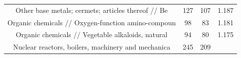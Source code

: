 \documentclass[10pt,]{article}
\begin{document}
\begin{longtable}[]{@{}cccc@{}}
\begin{minipage}[t]{0.38\columnwidth}
Other base metals; cermets; articles thereof // Be\strut
\end{minipage} & \begin{minipage}[t]{0.21\columnwidth}\centering\strut
127\strut
\end{minipage} & \begin{minipage}[t]{0.20\columnwidth}\centering\strut
107\strut
\end{minipage} & \begin{minipage}[t]{0.09\columnwidth}\centering\strut
1.187\strut
\end{minipage}\tabularnewline
\begin{minipage}[t]{0.38\columnwidth}\centering\strut
Organic chemicals // Oxygen-function amino-compoun\strut
\end{minipage} & \begin{minipage}[t]{0.21\columnwidth}\centering\strut
98\strut
\end{minipage} & \begin{minipage}[t]{0.20\columnwidth}\centering\strut
83\strut
\end{minipage} & \begin{minipage}[t]{0.09\columnwidth}\centering\strut
1.181\strut
\end{minipage}\tabularnewline
\begin{minipage}[t]{0.38\columnwidth}\centering\strut
Organic chemicals // Vegetable alkaloids, natural\strut
\end{minipage} & \begin{minipage}[t]{0.21\columnwidth}\centering\strut
94\strut
\end{minipage} & \begin{minipage}[t]{0.20\columnwidth}\centering\strut
80\strut
\end{minipage} & \begin{minipage}[t]{0.09\columnwidth}\centering\strut
1.175\strut
\end{minipage}\tabularnewline
\begin{minipage}[t]{0.38\columnwidth}\centering\strut
Nuclear reactors, boilers, machinery and mechanica\strut
\end{minipage} & \begin{minipage}[t]{0.21\columnwidth}\centering\strut
245\strut
\end{minipage} & \begin{minipage}[t]{0.20\columnwidth}\centering\strut
209\strut
\end{minipage} & \begin{minipage}[t]{0.09\columnwidth}\centering\strut

\end{minipage}
\end{longtable}
\end{document}
